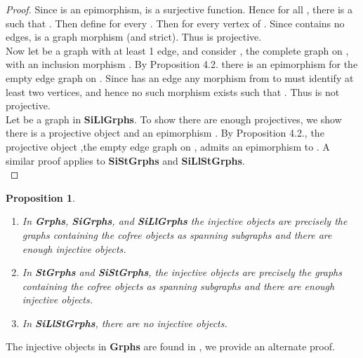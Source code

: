 \documentclass[11pt]{article}
\newtheorem{proposition}[theorem]{Proposition}
\begin{document}
\begin{proof}
\indent Since  is an epimorphism,  is a surjective function. Hence for all , there is a  such that . Then define  for every . Then  for every vertex  of . Since  contains no edges,  is a graph morphism (and strict). Thus  is projective.\\
\indent Now let  be a graph with at least 1 edge, and consider , the complete graph on , with an inclusion morphism . By Proposition 4.2. there is an epimorphism  for  the empty edge graph on . Since  has an edge any morphism from  to  must identify at least two vertices, and hence no such morphism  exists such that . Thus  is not projective.\\
\indent Let  be a graph in \textbf{SiLlGrphs}. To show there are enough projectives, we show there is a projective object  and an epimorphism . By Proposition 4.2., the projective object ,the empty edge graph on , admits an epimorphism to .  A similar proof applies to \textbf{SiStGrphs} and \textbf{SiLlStGrphs}.\\
\end{proof}
\begin{proposition}
\begin{enumerate}
\item In \textbf{Grphs}, \textbf{SiGrphs}, and \textbf{SiLlGrphs} the injective objects are precisely the graphs containing the cofree objects as spanning subgraphs and there are enough injective objects.
\item In \textbf{StGrphs} and \textbf{SiStGrphs}, the injective objects are precisely the graphs containing the cofree objects as spanning subgraphs and there are enough injective objects.
\item In \textbf{SiLlStGrphs}, there are no injective objects.
\end{enumerate}
\end{proposition}
The injective objects in \textbf{Grphs} are found in \cite{KKWil}, we provide an alternate proof.
\end{document}
